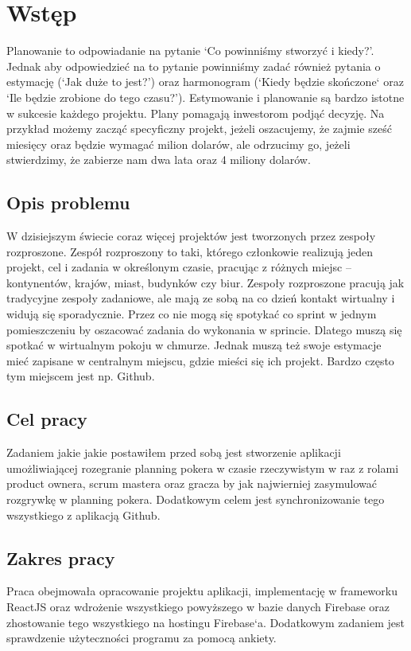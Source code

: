 \chapter*{Wstęp}

Planowanie to odpowiadanie na pytanie `Co powinniśmy stworzyć i kiedy?'.
Jednak aby odpowiedzieć na to pytanie powinniśmy zadać również pytania o estymację
(`Jak duże to jest?') oraz harmonogram (`Kiedy będzie skończone` oraz `Ile będzie zrobione do tego czasu?'). Estymowanie i planowanie są bardzo istotne w sukcesie każdego projektu. Plany pomagają inwestorom podjąć decyzję. Na przykład możemy zacząć specyficzny projekt, jeżeli oszacujemy, że zajmie sześć miesięcy oraz będzie wymagać milion dolarów, ale odrzucimy go, jeżeli stwierdzimy, że zabierze nam dwa lata oraz 4 miliony dolarów.\cite{Cohen_2006}

\section*{Opis problemu}

W dzisiejszym świecie coraz więcej projektów jest tworzonych przez zespoły rozproszone. Zespół rozproszony to taki, którego członkowie realizują jeden projekt, cel i zadania w określonym czasie, pracując z różnych miejsc – kontynentów, krajów, miast, budynków czy biur. Zespoły rozproszone pracują jak tradycyjne zespoły zadaniowe, ale mają ze sobą na co dzień kontakt wirtualny i widują się sporadycznie.\cite{www_rozproszony} Przez co nie mogą się spotykać co sprint w jednym pomieszczeniu by oszacować zadania do wykonania w sprincie. Dlatego muszą się spotkać w wirtualnym pokoju w chmurze. Jednak muszą też swoje estymacje mieć zapisane w centralnym miejscu, gdzie mieści się ich projekt. Bardzo często tym miejscem jest np. Github.

\section*{Cel pracy}

Zadaniem jakie jakie postawiłem przed sobą jest stworzenie aplikacji umożliwiającej rozegranie planning pokera w czasie rzeczywistym w raz z rolami product ownera, scrum mastera oraz gracza by jak najwierniej zasymulować rozgrywkę w planning pokera. Dodatkowym celem jest synchronizowanie tego wszystkiego z aplikacją Github.

\section*{Zakres pracy}

Praca obejmowała opracowanie projektu aplikacji, implementację w frameworku ReactJS oraz wdrożenie wszystkiego powyższego w bazie danych Firebase oraz zhostowanie tego wszystkiego na hostingu Firebase`a. Dodatkowym zadaniem jest sprawdzenie użyteczności programu za pomocą ankiety.
